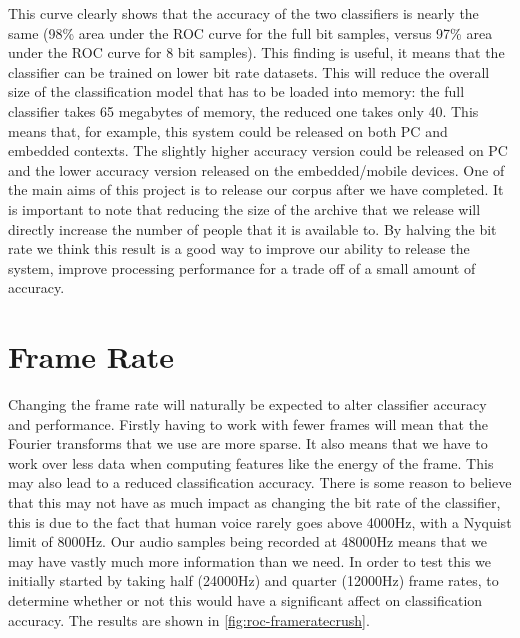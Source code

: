 \documentclass[ %
                    author={Sam Phippen},
                supervisor={Dr. Rafal Bogacz},
                     title={Real time voice activity detectors in noisy personal computing environments},
                  subtitle={},
                    degree={MEng},
                      year={2012} ]{thesis}
\begin{document}
This curve clearly shows that the accuracy of the two classifiers is nearly the
same (98\% area under the ROC curve for the full bit samples, versus 97\% area
under the ROC curve for 8 bit samples). This finding is useful, it means that
the classifier can be trained on lower bit rate datasets. This will reduce the
overall size of the classification model that has to be loaded into memory: the
full classifier takes 65 megabytes of memory, the reduced one takes only 40.
This means that, for example, this system could be released on both PC and
embedded contexts. The slightly higher accuracy version could be released on PC
and the lower accuracy version released on the embedded/mobile devices. One of
the main aims of this project is to release our corpus after we have completed.
It is important to note that reducing the size of the archive that we release
will directly increase the number of people that it is available to. By halving
the bit rate we think this result is a good way to improve our ability to
release the system, improve processing performance for a trade off of a small
amount of accuracy.

\section{Frame Rate}

Changing the frame rate will naturally be expected to alter classifier accuracy
and performance. Firstly having to work with fewer frames will mean that the
Fourier transforms that we use are more sparse. It also means that we have to
work over less data when computing features like the energy of the frame. This
may also lead to a reduced classification accuracy. There is some reason to
believe that this may not have as much impact as changing the bit rate of the
classifier, this is due to the fact that human voice rarely goes above 4000Hz,
with a Nyquist limit of 8000Hz. Our audio samples being recorded at 48000Hz
means that we may have vastly much more information than we need. In order to
test this we initially started by taking half (24000Hz) and quarter (12000Hz)
frame rates, to determine whether or not this would have a significant affect
on classification accuracy. The results are shown in
\ref{fig:roc-frameratecrush}.
\end{document}
